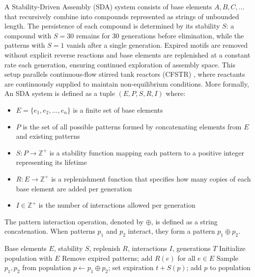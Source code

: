 \documentclass{artificial-life}
\let\cite\citep
\begin{document}
A Stability-Driven Assembly (SDA) system consists of base elements $A, B, C, \dots$ that recursively combine into compounds represented as
strings of unbounded length. The persistence of each compound is determined by its
stability $S$: a compound with $S=30$ remains for 30 generations before elimination, while the patterns with $S=1$ vanish after a single generation. 
Expired motifs are removed without explicit reverse reactions and base
elements are replenished at a constant rate each generation, ensuring
continued exploration of assembly space. This setup parallels continuous-flow 
stirred tank reactors (CFSTR) \cite{fogler1999chemical}, where reactants are
continuously supplied to maintain non-equilibrium conditions. More formally, An SDA system is defined as a tuple $(E, P, S, R, I)$ where:
\begin{itemize}
   \item[] $E = \{e_1, e_2, \ldots, e_n\}$ is a finite set of base elements
   \item[] $P$ is the set of all possible patterns formed by concatenating elements from $E$ and existing patterns
   \item[] $S: P \rightarrow \mathbb{Z}^{+}$ is a stability function mapping each pattern to a positive integer representing its lifetime
   \item[] $R: E \rightarrow \mathbb{Z}^{+}$ is a replenishment function that specifies how many copies of each base element are added per generation
   \item[]  $I \in \mathbb{Z}^{+}$ is the number of interactions allowed per generation
\end{itemize}
The pattern interaction operation, denoted by $\oplus$, is defined as a string concatenation. When patterns $p_1$ and $p_2$ interact, they form a pattern $p_1 \oplus p_2$.

\begin{algorithm}[H]
\caption{Stability-Driven Assembly (SDA)}
\begin{algorithmic}[1]
\REQUIRE Base elements $E$, stability $S$, replenish $R$, interactions $I$, generations $T$
\STATE Initialize population with $E$
  \STATE Remove expired patterns; add $R(e)$ for all $e\in E$
    \STATE Sample $p_1,p_2$ from population
    \STATE $p\leftarrow p_1\oplus p_2$; set expiration $t+S(p)$; add $p$ to population
  \ENDFOR
\ENDFOR
\end{algorithmic}
\end{algorithm}
\end{document}
